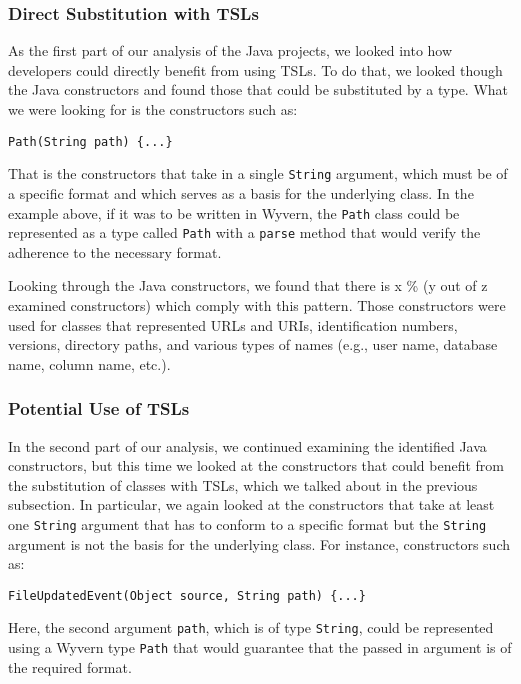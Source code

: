 \subsubsection{Direct Substitution with TSLs}

As the first part of our analysis of the Java projects, we looked into how developers could directly benefit  from using TSLs. To do that, we looked though the Java constructors and found those that could be substituted by a type. What we were looking for is the constructors such as:

\begin{lstlisting}
Path(String path) {...}
\end{lstlisting}

That is the constructors that take in a single \lstinline{String} argument, which must be of a specific format and which serves as a basis for the underlying class. In the example above, if it was to be written in Wyvern, the \lstinline{Path} class could be represented as a type called \lstinline{Path} with a \lstinline{parse} method that would verify the adherence to the necessary format.

Looking through the Java constructors, we found that there is x \% (y out of z examined constructors) which comply with this pattern. Those constructors were used for classes that represented URLs and URIs, identification numbers, versions, directory paths, and various types of names (e.g., user name, database name, column name, etc.).

\subsubsection{Potential Use of TSLs}

In the second part of our analysis, we continued examining the identified Java constructors, but this time we looked at the constructors that could benefit from the substitution of classes with TSLs, which we talked about in the previous subsection. In particular, we again looked at the constructors that take at least one \lstinline{String} argument that has to conform to a specific format but the \lstinline{String} argument is not the basis for the underlying class. For instance, constructors such as:

\begin{lstlisting}
FileUpdatedEvent(Object source, String path) {...}
\end{lstlisting}

Here, the second argument \lstinline{path}, which is of type \lstinline{String}, could be represented using a Wyvern type \lstinline{Path} that would guarantee that the passed in argument is of the required format.


